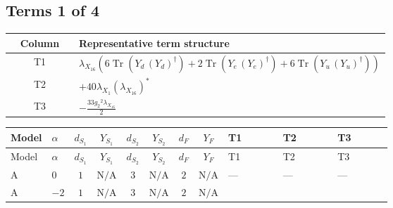 \documentclass[8pt]{article}
\begin{document}
\begin{landscape}
\subsection*{Terms 1 of 4}
\begin{center}
\begin{tabular}{@{}c >{\raggedright\arraybackslash}p{0.82\linewidth}@{}}
\toprule
Column & Representative term structure \\
\midrule
T1 & \(\displaystyle {\lambda_{X_{16}}} (6 \operatorname{Tr}\!\left({Y_d}\,\left({Y_d}\right)^{\dagger}\right)+2 \operatorname{Tr}\!\left({Y_e}\,\left({Y_e}\right)^{\dagger}\right)+6 \operatorname{Tr}\!\left({Y_u}\,\left({Y_u}\right)^{\dagger}\right))\) \\
\midrule
T2 & \(\displaystyle +40 {\lambda_{X_{1}}} \left({\lambda_{X_{16}}}\right)^{*}\) \\
\midrule
T3 & \(\displaystyle -\frac{33 {g_2}^2 {\lambda_{X_{16}}}}{2}\) \\
\midrule
\bottomrule
\end{tabular}
\end{center}
\smallskip
\tiny
\begin{longtable}{@{}llcccccc >{\raggedright\arraybackslash}p{0.21\linewidth} >{\raggedright\arraybackslash}p{0.21\linewidth} >{\raggedright\arraybackslash}p{0.21\linewidth}@{}}
\toprule
Model & $\alpha$ & $d_{S_1}$ & $Y_{S_1}$ & $d_{S_2}$ & $Y_{S_2}$ & $d_F$ & $Y_F$ & T1 & T2 & T3 \\
\midrule
\endfirsthead
\toprule
Model & $\alpha$ & $d_{S_1}$ & $Y_{S_1}$ & $d_{S_2}$ & $Y_{S_2}$ & $d_F$ & $Y_F$ & T1 & T2 & T3 \\
\midrule
\endhead
A & $0$ & $1$ & $\text{N/A}$ & $3$ & $\text{N/A}$ & $2$ & $\text{N/A}$ & --- & --- & --- \\
\midrule
A & $-2$ & $1$ & $\text{N/A}$ & $3$ & $\text{N/A}$ & $2$ & $\text{N/A}$ & \scriptsize\adjustbox{max width=\linewidth}{$\begin{gathered} {\lambda_{X_{16}}} (6 \operatorname{Tr}\!\left({Y_d}\,\left({Y_d}\right)^{\dagger}\right)+2 \operatorname{Tr}\!\left({Y_e}\,\left({Y_e}\right)^{\dagger}\right)+6 \operatorname{Tr}\!\left({Y_u}\,\left({Y_u}\right)^{\dagger}\right))\end{gathered}$} & \scriptsize\adjustbox{max width=\linewidth}{$\begin{gathered} +40 {\lambda_{X_{1}}} \left({\lambda_{X_{16}}}\right)^{*}\end{gathered}$} & \scriptsize\adjustbox{max width=\linewidth}{$\begin{gathered} -\frac{33 {g_2}^2 {\lambda_{X_{16}}}}{2}\end{gathered}$} \\

\end{longtable}
\end{landscape}
\end{document}
